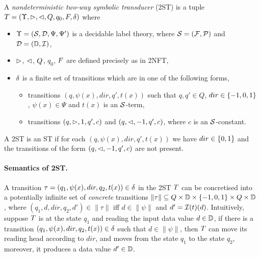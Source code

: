 \begin{definition}
    A \emph{nondeterministic two-way  symbolic \emph{transducer}} (2ST) is a tuple $T = (\Upsilon, \vartriangleright, \vartriangleleft, Q, q_0, F, \delta)$ where  
\begin{itemize}
\item $\Upsilon=(\mathcal{S}, \mathcal{D}, \Psi, \Psi')$ is a decidable label theory, where $\mathcal{S} = ({\mathcal{F}}, {\mathcal{P}})$ and $\mathcal{D} = (\mathbb{D}, \mathcal{I})$,
%
\item $\vartriangleright$, $\vartriangleleft$, $Q$, $q_0$, $F$ are defined precisely as in 2NFT, 
%
\item $\delta$ is a finite set of  transitions which are in one of the following forms,
\begin{itemize}
\item   transitions $(q, \psi(x), dir, q', t(x))$ such that $q, q' \in Q$, $dir \in \{-1, 0, 1\}$, $\psi(x) \in \Psi$ and
$t(x)$ is an $\mathcal{S}$-term, 
\item   transitions $(q, \vartriangleright, 1, q', c)$ and $(q, \vartriangleleft, -1, q', c)$, where $c$ is an $\mathcal{S}$-constant. 
\end{itemize}
\end{itemize}
A 2ST is an ST if for each $(q, \psi(x), dir, q', t(x))$ we have $dir \in \{0, 1\}$ and the transitions of the form $(q, \vartriangleleft, -1, q', c)$ are not present.
\end{definition}

\paragraph{Semantics of 2ST.}
A transition $\tau=(q_1,\psi(x), dir, q_2, t(x)) \in \delta$ in the 2ST $T$ can be concretised
into a potentially infinite set of \emph{concrete} transitions $\|\tau\| \subseteq Q \times \mathbb{D} \times \{-1, 0, 1\} \times Q \times \mathbb{D}$, where $(q_1, d, dir, q_2, d')  \in \|\tau\|$ iff $d \in \|\psi\|$ and $d' = \mathcal{I}(t)(d)$.
Intuitively, suppose $T$ is at the state $q_1$ and reading the input data value $d \in \mathbb{D}$,
if there is a transition $(q_1, \psi(x), dir, q_2, t(x) )\in \delta$ such that $d \in \|\psi\|$, then $T$ can move its reading head according to $dir$, and moves from the state
$q_1$ to the state $q_2$, moreover, it produces a data value $d' \in \mathbb{D}$.

